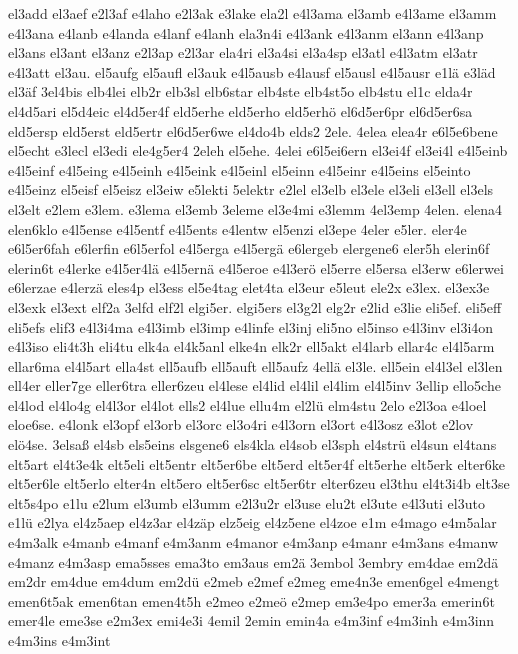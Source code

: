 {el3add
el3aef
e2l3af
e4laho
e2l3ak
e3lake
ela2l
e4l3ama
el3amb
e4l3ame
el3amm
e4l3ana
e4lanb
e4landa
e4lanf
e4lanh
ela3n4i
e4l3ank
e4l3anm
el3ann
e4l3anp
el3ans
el3ant
el3anz
e2l3ap
e2l3ar
ela4ri
el3a4si
el3a4sp
el3atl
e4l3atm
el3atr
e4l3att
el3au.
el5aufg
el5aufl
el3auk
e4l5ausb
e4lausf
el5ausl
e4l5ausr
e1lä
e3läd
el3äf
3el4bis
elb4lei
elb2r
elb3sl
elb6star
elb4ste
elb4st5o
elb4stu
el1c
elda4r
el4d5ari
el5d4eic
el4d5er4f
eld5erhe
eld5erho
eld5erhö
el6d5er6pr
el6d5er6sa
eld5ersp
eld5erst
eld5ertr
el6d5er6we
el4do4b
elds2
2ele.
4elea
elea4r
e6l5e6bene
el5echt
e3lecl
el3edi
ele4g5er4
2eleh
el5ehe.
4elei
e6l5ei6ern
el3ei4f
el3ei4l
e4l5einb
e4l5einf
e4l5eing
e4l5einh
e4l5eink
e4l5einl
el5einn
e4l5einr
e4l5eins
el5einto
e4l5einz
el5eisf
el5eisz
el3eiw
e5lekti
5elektr
e2lel
el3elb
el3ele
el3eli
el3ell
el3els
el3elt
e2lem
e3lem.
e3lema
el3emb
3eleme
el3e4mi
e3lemm
4el3emp
4elen.
elena4
elen6klo
e4l5ense
e4l5entf
e4l5ents
e4lentw
el5enzi
el3epe
4eler
e5ler.
eler4e
e6l5er6fah
e6lerfin
e6l5erfol
e4l5erga
e4l5ergä
e6lergeb
elergene6
eler5h
elerin6f
elerin6t
e4lerke
e4l5er4lä
e4l5ernä
e4l5eroe
e4l3erö
el5erre
el5ersa
el3erw
e6lerwei
e6lerzae
e4lerzä
eles4p
el3ess
el5e4tag
elet4ta
el3eur
e5leut
ele2x
e3lex.
el3ex3e
el3exk
el3ext
elf2a
3elfd
elf2l
elgi5er.
elgi5ers
el3g2l
elg2r
e2lid
e3lie
eli5ef.
eli5eff
eli5efs
elif3
e4l3i4ma
e4l3imb
el3imp
e4linfe
el3inj
eli5no
el5inso
e4l3inv
el3i4on
e4l3iso
eli4t3h
eli4tu
elk4a
el4k5anl
elke4n
elk2r
ell5akt
el4larb
ellar4c
el4l5arm
ellar6ma
el4l5art
ella4st
ell5aufb
ell5auft
ell5aufz
4ellä
el3le.
ell5ein
el4l3el
el3len
ell4er
eller7ge
eller6tra
eller6zeu
el4lese
el4lid
el4lil
el4lim
el4l5inv
3ellip
ello5che
el4lod
el4lo4g
el4l3or
el4lot
ells2
el4lue
ellu4m
el2lü
elm4stu
2elo
e2l3oa
e4loel
eloe6se.
e4lonk
el3opf
el3orb
el3orc
el3o4ri
e4l3orn
el3ort
e4l3osz
e3lot
e2lov
elö4se.
3elsaß
el4sb
els5eins
elsgene6
els4kla
el4sob
el3sph
el4strü
el4sun
el4tans
elt5art
el4t3e4k
elt5eli
elt5entr
elt5er6be
elt5erd
elt5er4f
elt5erhe
elt5erk
elter6ke
elt5er6le
elt5erlo
elter4n
elt5ero
elt5er6sc
elt5er6tr
elter6zeu
el3thu
el4t3i4b
elt3se
elt5s4po
e1lu
e2lum
el3umb
el3umm
e2l3u2r
el3use
elu2t
el3ute
e4l3uti
el3uto
e1lü
e2lya
el4z5aep
el4z3ar
el4zäp
elz5eig
el4z5ene
el4zoe
e1m
e4mago
e4m5alar
e4m3alk
e4manb
e4manf
e4m3anm
e4manor
e4m3anp
e4manr
e4m3ans
e4manw
e4manz
e4m3asp
ema5sses
ema3to
em3aus
em2ä
3embol
3embry
em4dae
em2dä
em2dr
em4due
em4dum
em2dü
e2meb
e2mef
e2meg
eme4n3e
emen6gel
e4mengt
emen6t5ak
emen6tan
emen4t5h
e2meo
e2meö
e2mep
em3e4po
emer3a
emerin6t
emer4le
eme3se
e2m3ex
emi4e3i
4emil
2emin
emin4a
e4m3inf
e4m3inh
e4m3inn
e4m3ins
e4m3int
}
